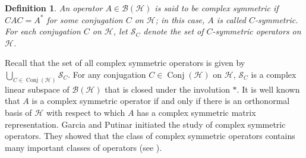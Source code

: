 \documentclass[11pt]{amsart}
\newtheorem{definition}[theorem]{Definition}
\theoremstyle{remark}
\newcommand{\BH}{\mathcal{B(H)}}
\newcommand{\cH}{{\mathcal{H}}}
\newcommand{\SC}{\mathcal{S}_C}
\newcommand{\Conj}{\operatorname{Conj}(\cH)}
\begin{document}
\begin{definition}
An operator $A \in\BH$ is said to be complex symmetric if
$CAC=A^*$ for some conjugation $C$ on $\cH$; in this case, $A$ is called  $C$-symmetric. For each conjugation $C$ on $\cH$, let $\SC$ denote the set of  $C$-symmetric operators on $\cH$. 
\end{definition}

Recall that the set of all complex symmetric operators is given by $\bigcup_{C \in \Conj} \SC$. For any conjugation $C \in \Conj$ on $\cH$,  $\SC$ is a complex linear subspace of $\BH$ that is closed under the involution $*$. It is well known that $A$ is a complex symmetric operator if and only if there is an orthonormal basis of $\cH$ with respect to which $A$ has a complex symmetric matrix representation. Garcia and Putinar initiated the study of complex symmetric operators. They showed that the class of complex symmetric operators contains many important classes of operators (see \cite{GP}). %
\end{document}
